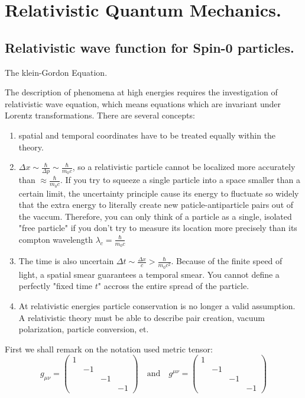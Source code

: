 \chapter{Relativistic Quantum Mechanics.}

\section{Relativistic wave function for Spin-0 particles.}
The klein-Gordon Equation.

The description of phenomena at high energies requires the investigation of relativistic wave equation, which means equations which are invariant under Lorentz transformations.
There are several concepts:
\begin{enumerate}
    \item spatial and temporal coordinates have to be treated equally within the theory.
    \item $\Delta x \sim \frac{\hbar}{\Delta p} \sim \frac{\hbar}{m_0 c}$, so a relativistic particle cannot be localized more accurately than $\approx \frac{\hbar}{m_0 c}$. If you try to squeeze a single particle into a space smaller than a certain limit, the uncertainty principle cause its energy to fluctuate so widely that the extra energy to literally create new paticle-antiparticle pairs out of the vaccum. Therefore, you can only think of a particle as a single, isolated "free particle" if you don't try to measure its location more precisely than its compton wavelength $\lambda_c = \frac{\hbar}{m_0 c}$
    \item The time is also uncertain $\Delta t \sim \frac{\Delta x}{c} > \frac{\hbar}{m_0 c^2}$. Because of the finite speed of light, a spatial smear guarantees a temporal smear. You cannot define a perfectly "fixed time $t$" accross the entire spread of the particle.
    \item At relativistic energies particle conservation is no longer a valid assumption. A relativistic theory must be able to describe pair creation, vacuum polarization, particle conversion, et.
\end{enumerate}

First we shall remark on the notation used
metric tensor:
\begin{equation}
g_{\mu\nu} = \begin{pmatrix} 1 & & & \\ & -1 & & \\ & & -1 & \\ & & & -1 \end{pmatrix} \quad \text{and} \quad g^{\mu\nu} = \begin{pmatrix} 1 & & & \\ & -1 & & \\ & & -1 & \\ & & & -1 \end{pmatrix}
\end{equation}

